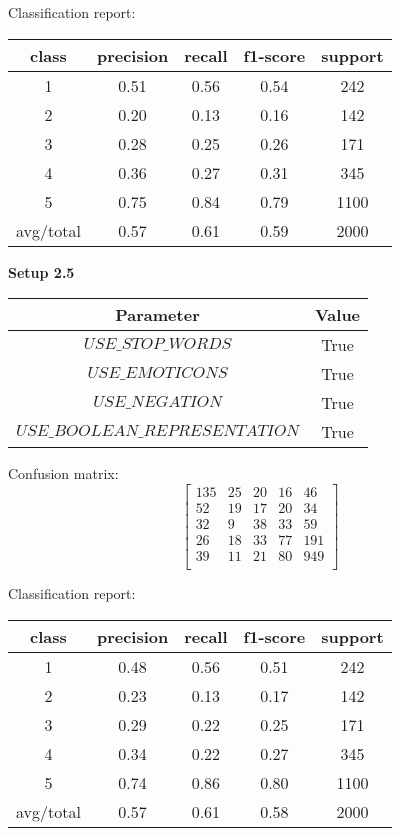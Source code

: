 \documentclass[12pt]{report}
\begin{document}
Classification report:

\begin{center}
	\begin{tabular}{c | c | c | c | c }
		\hline
		class & precision & recall & f1-score & support \\ \hline
		1 & 0.51 & 0.56 & 0.54 & 242 \\ \hline
		2 & 0.20 & 0.13 & 0.16 & 142 \\ \hline
		3 & 0.28 & 0.25 & 0.26 & 171 \\ \hline
		4 & 0.36 & 0.27 & 0.31 & 345 \\ \hline
		5 & 0.75 & 0.84 & 0.79 & 1100 \\ \hline
		avg/total & 0.57 & 0.61 & 0.59 & 2000 \\ \hline
	\end{tabular}
\end{center}


\textbf{Setup 2.5}

\begin{center}
	\begin{tabular}{ c | c }
		\hline
		Parameter & Value \\ \hline
		$USE\_STOP\_WORDS$ & True \\ \hline
		$USE\_EMOTICONS$ & True \\ \hline
		$USE\_NEGATION$ & True \\ \hline
		$USE\_BOOLEAN\_REPRESENTATION$ & True \\ \hline
	\end{tabular}
\end{center}

Confusion matrix:
\[
\begin{bmatrix}
135 & 25 & 20 & 16 & 46 \\
52 & 19 & 17 & 20 & 34 \\
32 &  9 & 38 & 33 & 59 \\
26 & 18 & 33 & 77 & 191 \\
39 & 11 & 21 & 80 & 949 \\
\end{bmatrix}
\]

Classification report:

\begin{center}
	\begin{tabular}{c | c | c | c | c }
		\hline
		class & precision & recall & f1-score & support \\ \hline
		1 & 0.48 & 0.56 & 0.51 & 242 \\ \hline
		2 & 0.23 & 0.13 & 0.17 & 142 \\ \hline
		3 & 0.29 & 0.22 & 0.25 & 171 \\ \hline
		4 & 0.34 & 0.22 & 0.27 & 345 \\ \hline
		5 & 0.74 & 0.86 & 0.80 & 1100 \\ \hline
		avg/total & 0.57 & 0.61 & 0.58 & 2000 \\ \hline
	\end{tabular}
\end{center}
\end{document}
